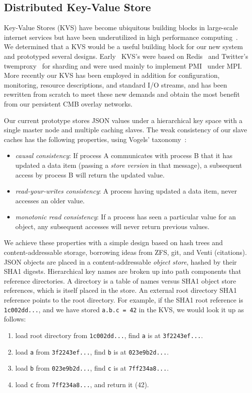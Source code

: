 \subsection{Distributed Key-Value Store}

Key-Value Stores (KVS) have become ubiquitous building blocks in large-scale
internet services but have been underutilized in high performance
computing~\cite{Wang:2013:USE:2503210.2503239}.
We determined that a KVS would be a
useful building block for our new system and prototyped several designs.
Early \flux\ KVS's were based on Redis~\cite{Redis} and Twitter's
twemproxy~\cite{Twemproxy} for sharding and were used mainly to implement
PMI~\cite{PMI2} under MPI.  More recently our KVS has been employed 
in addition for configuration, monitoring, resource descriptions, and
standard I/O streams, and has been rewritten from scratch to meet these
new demands and obtain the most benefit from our persistent CMB overlay
networks.

Our current prototype stores JSON values under a hierarchical key space
with a single master node and multiple caching slaves.  The weak consistency
of our slave caches has the following properties, using Vogels'
taxonomy~\cite{Vogels:2009:EC:1435417.1435432}:
\begin{itemize}
\item{{\em causal consistency}:  If process A communicates with process B
that it has updated a data item (passing a {\em store version} in that
message), a subsequent access by process B will return the updated value.}
\item{{\em read-your-writes consistency}:  A process having updated a
data item, never accesses an older value.}
\item{{\em monotonic read consistency}:  If a process has seen a particular
value for an object, any subsequent accesses will never return previous values.}
\end{itemize}

We achieve these properties with a simple design based on hash trees
and content-addressable storage, borrowing ideas from ZFS, git, and 
Venti (citations).  JSON objects are placed in a content-addressable
{\em object store}, hashed by their SHA1 digests.
Hierarchical key names are broken up into path components that reference
directories.
A directory is a table of names versus SHA1 object store references,
which is itself placed in the store.  An external root directory SHA1
reference points to the root directory.
For example, if the SHA1 root reference is {\tt 1c002dd...}, and we have
stored {\tt a.b.c = 42} in the KVS, we would look it up as follows:
\begin{enumerate}
\item{load root directory from {\tt 1c002dd...}, find {\tt a} is at
{\tt 3f2243ef...}.}
\item{load {\tt a} from {\tt 3f2243ef...}, find {\tt b} is at
{\tt 023e9b2d...}.}
\item{load {\tt b} from {\tt 023e9b2d...}, find {\tt c} is at
{\tt 7ff234a8...}.}
\item{load {\tt c} from {\tt 7ff234a8...}, and return it (42).}
\end{enumerate}


